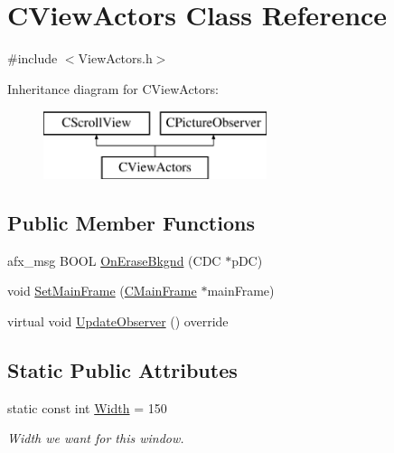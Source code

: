 \hypertarget{class_c_view_actors}{}\section{C\+View\+Actors Class Reference}
\label{class_c_view_actors}


{\ttfamily \#include $<$View\+Actors.\+h$>$}

Inheritance diagram for C\+View\+Actors\+:\begin{figure}[H]
\begin{center}
\leavevmode
\includegraphics[height=2.000000cm]{class_c_view_actors}
\end{center}
\end{figure}
\subsection*{Public Member Functions}
\begin{DoxyCompactItemize}
\item 
afx\+\_\+msg B\+O\+O\+L \hyperlink{class_c_view_actors_a561f4be212bd5df4a667c2cb0b23e472}{On\+Erase\+Bkgnd} (C\+D\+C $\ast$p\+D\+C)
\item 
void \hyperlink{class_c_view_actors_a6f68ae9e71f6a195502464bf34b3e724}{Set\+Main\+Frame} (\hyperlink{class_c_main_frame}{C\+Main\+Frame} $\ast$main\+Frame)
\item 
virtual void \hyperlink{class_c_view_actors_a5014f8c616850b8e874dee895b2ba698}{Update\+Observer} () override
\end{DoxyCompactItemize}
\subsection*{Static Public Attributes}
\begin{DoxyCompactItemize}
\item 
\hypertarget{class_c_view_actors_a8bb27cbe8ae099abbed012adca884f1f}{}static const int \hyperlink{class_c_view_actors_a8bb27cbe8ae099abbed012adca884f1f}{Width} = 150\label{class_c_view_actors_a8bb27cbe8ae099abbed012adca884f1f}

\begin{DoxyCompactList}\small\item\em Width we want for this window. \end{DoxyCompactList}\end{DoxyCompactItemize}
